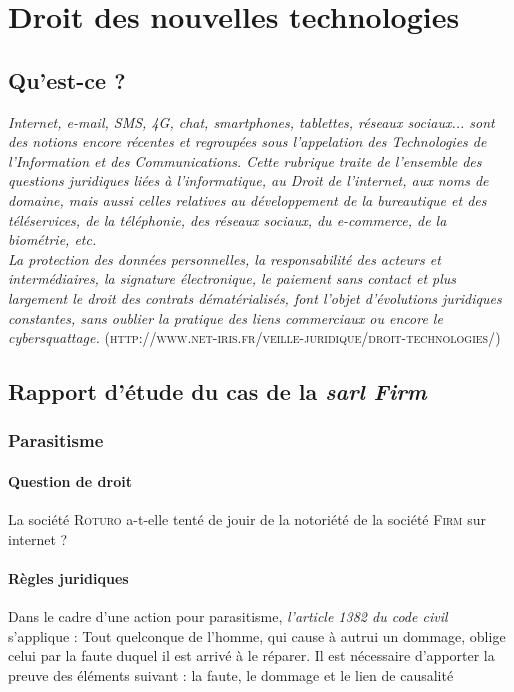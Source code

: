 \chapter{Droit des nouvelles technologies}
\thispagestyle{fancy} 

\section{Qu'est-ce ?}

\emph{Internet, e-mail, SMS, 4G, chat, smartphones, tablettes, réseaux sociaux... sont des notions encore récentes et regroupées sous l'appelation des Technologies de l'Information et des Communications. Cette rubrique traite de l'ensemble des questions juridiques liées à l'informatique, au Droit de l'internet, aux noms de domaine, mais aussi celles relatives au développement de la bureautique et des téléservices, de la téléphonie, des réseaux sociaux, du e-commerce, de la biométrie, etc.\\
La protection des données personnelles, la responsabilité des acteurs et intermédiaires, la signature électronique, le paiement sans contact et plus largement le droit des contrats dématérialisés, font l'objet d'évolutions juridiques constantes, sans oublier la pratique des liens commerciaux ou encore le cybersquattage.} (\textsc{http://www.net-iris.fr/veille-juridique/droit-technologies/})

\section{Rapport d'étude du cas de la \emph{sarl Firm}}

\subsection{Parasitisme}
\subsubsection{Question de droit}
La société \textsc{Roturo} a-t-elle tenté de jouir de la notoriété de la société \textsc{Firm} sur internet ?
\subsubsection{Règles juridiques}
Dans le cadre d'une action pour parasitisme, \textit{l'article 1382 du code civil} s'applique :
Tout quelconque de l'homme, qui cause à autrui un dommage, oblige celui par la faute duquel il est arrivé à le réparer.
Il est nécessaire d'apporter la preuve des éléments suivant : la faute, le dommage et le lien de causalité
